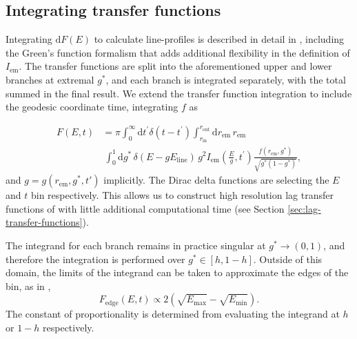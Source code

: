 \documentclass[fleqn,usenatbib]{mnras}
\renewcommand{\d}{\text{d}}
\begin{document}
\subsection{Integrating transfer functions}
\label{sec:transfer-function-integration}

Integrating $\d F(E)$ to calculate line-profiles is described in detail in \cite{dauser_broad_2010}, including the Green's function formalism that adds additional flexibility in the definition of $I_\text{em}$. The transfer functions are split into the aforementioned upper and lower branches at extremal $g^\ast$, and each branch is integrated separately, with the total summed in the final result. We extend the transfer function integration to include the geodesic coordinate time, integrating $f$ as

\begin{align}
    \label{eq:transfer-integration}
    F(E, t) &=
    \pi
    \int_0^\infty \d t^\prime \delta(t - t^\prime)
    \int_{r_\text{in}}^{r_\text{out}} \d r_\text{em}\,r_\text{em} \nonumber \\
    &\ \int_0^1 \d g^\ast\, \delta(E - gE_\text{line})\, g^2 I_\text{em}\left(\frac{E}{g}, t^\prime\right) \frac{f(r_\text{em}, g^\ast)}{\sqrt{g^\ast (1 - g^\ast)}},
\end{align}
\noindent and $g = g( r_\text{em}, g^\ast, t')$ implicitly. The Dirac delta functions are selecting the $E$ and $t$ bin respectively. This allows us to construct high resolution lag transfer functions of \cite{reynolds_x-ray_1999} with little additional computational time (see Section \ref{sec:lag-transfer-functions}).

The integrand for each branch remains in practice singular at $g^\ast \rightarrow (0, 1)$, and therefore the integration is performed over $g^\ast \in [h, 1 - h]$. Outside of this domain, the limits of the integrand can be taken to approximate the edges of the bin, as in \cite{dauser_broad_2010},
\begin{equation}
   F_\text{edge}(E,t) \propto 2\left( \sqrt{E_\text{max}} - \sqrt{E_\text{min}} \right).
\end{equation}
The constant of proportionality is determined from evaluating the integrand at $h$ or $1 - h$ respectively.
\end{document}

